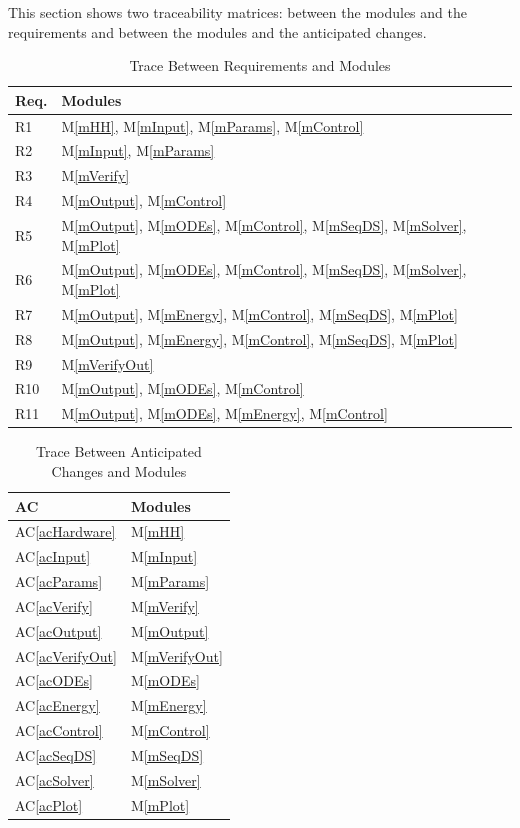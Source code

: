 \documentclass[12pt, titlepage]{article}
\newcommand{\acref}[1]{AC\ref{#1}}
\newcommand{\mref}[1]{M\ref{#1}}
\begin{document}
This section shows two traceability matrices: between the modules and the
requirements and between the modules and the anticipated changes.

\begin{table}[H]
\centering
\begin{tabular}{p{} p{}}
\toprule
\textbf{Req.} & \textbf{Modules}\\
\midrule
R1 & \mref{mHH}, \mref{mInput}, \mref{mParams}, \mref{mControl}\\
R2 & \mref{mInput}, \mref{mParams}\\
R3 & \mref{mVerify}\\
R4 & \mref{mOutput}, \mref{mControl}\\
R5 & \mref{mOutput}, \mref{mODEs}, \mref{mControl}, \mref{mSeqDS}, \mref{mSolver}, \mref{mPlot}\\
R6 & \mref{mOutput}, \mref{mODEs}, \mref{mControl}, \mref{mSeqDS}, \mref{mSolver}, \mref{mPlot}\\
R7 & \mref{mOutput}, \mref{mEnergy}, \mref{mControl}, \mref{mSeqDS}, \mref{mPlot}\\
R8 & \mref{mOutput}, \mref{mEnergy}, \mref{mControl}, \mref{mSeqDS}, \mref{mPlot}\\
R9 & \mref{mVerifyOut}\\
R10 & \mref{mOutput}, \mref{mODEs}, \mref{mControl}\\
R11 & \mref{mOutput}, \mref{mODEs}, \mref{mEnergy}, \mref{mControl}\\
\bottomrule
\end{tabular}
\caption{Trace Between Requirements and Modules}
\label{TblRT}
\end{table}

\begin{table}[H]
\centering
\begin{tabular}{p{} p{}}
\toprule
\textbf{AC} & \textbf{Modules}\\
\midrule
\acref{acHardware} & \mref{mHH}\\
\acref{acInput} & \mref{mInput}\\
\acref{acParams} & \mref{mParams}\\
\acref{acVerify} & \mref{mVerify}\\
\acref{acOutput} & \mref{mOutput}\\
\acref{acVerifyOut} & \mref{mVerifyOut}\\
\acref{acODEs} & \mref{mODEs}\\
\acref{acEnergy} & \mref{mEnergy}\\
\acref{acControl} & \mref{mControl}\\
\acref{acSeqDS} & \mref{mSeqDS}\\
\acref{acSolver} & \mref{mSolver}\\
\acref{acPlot} & \mref{mPlot}\\
\bottomrule
\end{tabular}
\caption{Trace Between Anticipated Changes and Modules}
\label{TblACT}
\end{table}
\end{document}

